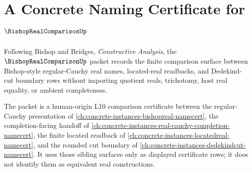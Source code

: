 \chapter{A Concrete Naming Certificate for $\BishopRealComparisonUp$}
\label{ch:concrete-instances-bishoprealcomparison-namecert}

Following Bishop and Bridges, \emph{Constructive Analysis}, the $\BishopRealComparisonUp$ packet records the finite comparison surface between Bishop-style regular-Cauchy real names, located-real readbacks, and Dedekind-cut boundary rows without importing quotient reals, trichotomy, host real equality, or ambient completeness.

The packet is a human-origin L10 comparison certificate between the regular-Cauchy presentation of \autoref{ch:concrete-instances-bishopreal-namecert}, the completion-facing handoff of \autoref{ch:concrete-instances-real-cauchy-completion-namecert}, the finite located readback of \autoref{ch:concrete-instances-locatedreal-namecert}, and the rounded cut boundary of \autoref{ch:concrete-instances-dedekindcut-namecert}. It uses those sibling surfaces only as displayed certificate rows; it does not identify them as equivalent real constructions.

